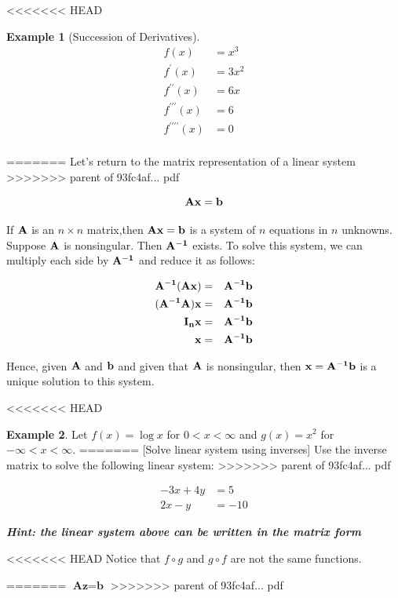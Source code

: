 \documentclass[]{book}
\theoremstyle{definition}
\theoremstyle{definition}
\newtheorem{example}{Example}[chapter]
\theoremstyle{definition}
\theoremstyle{remark}
\begin{document}
<<<<<<< HEAD
\begin{example}[Succession of Derivatives]
\protect\hypertarget{exm:unnamed-chunk-16}{}{\label{exm:unnamed-chunk-16} {} }\begin{align*}
f(x) &=x^3\\
f^{\prime}(x) &=3x^2\\
f^{\prime\prime}(x) &=6x \\
f^{\prime\prime\prime}(x) &=6\\
f^{\prime\prime\prime\prime}(x) &=0\\
\end{align*}
\end{example}
=======
Let's return to the matrix representation of a linear system
>>>>>>> parent of 93fc4af... pdf

\[\bf{Ax} = \bf{b}\]

If \(\bf{A}\) is an \(n\times n\) matrix,then \(\bf{Ax}=\bf{b}\) is a system of \(n\) equations in \(n\) unknowns. Suppose \(\bf{A}\) is nonsingular. Then \(\bf{A}^{-1}\) exists. To solve this system, we can multiply each side by \(\bf{A}^{-1}\) and reduce it as follows:

\begin{eqnarray*} 
\bf{A}^{-1} (\bf{A} \bf{x}) & = & \bf{A}^{-1} \bf{b} \\
(\bf{A}^{-1} \bf{A})\bf{x} & = & \bf{A}^{-1} \bf{b}\\
\bf{I}_n \bf{x}     & = & \bf{A}^{-1} \bf{b}\\
\bf{x} & = & \bf{A}^{-1} \bf{b}
\end{eqnarray*}

Hence, given \(\bf{A}\) and \(\bf{b}\) and given that \(\bf{A}\) is nonsingular, then \(\bf{x} = \bf{A}^{-1} \bf{b}\) is a unique solution to this system.

<<<<<<< HEAD
\begin{example}
\protect\hypertarget{exm:unnamed-chunk-17}{}{\label{exm:unnamed-chunk-17} }Let \(f(x)=\log x\) for \(0<x<\infty\) and \(g(x)=x^2\) for \(-\infty<x<\infty\).
=======
[Solve linear system using inverses]
\protect\hypertarget{exr:invlinsys}{}{\label{exr:invlinsys} {} }
Use the inverse matrix to solve the following linear system:
>>>>>>> parent of 93fc4af... pdf

\begin{align*} 
-3x + 4y &= 5 \\
2x - y &= -10
\end{align*}

\textbf{\emph{Hint: the linear system above can be written in the matrix form}}

<<<<<<< HEAD
Notice that \(f\circ g\) and \(g\circ f\) are not the same functions.
\end{example}
=======
\(\textbf{A}\textbf{z} = \textbf{b}\)
>>>>>>> parent of 93fc4af... pdf
\end{document}
